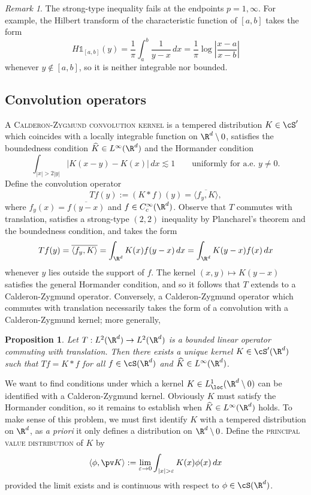 \documentclass[reqno]{amsart}
\newtheorem{proposition}[theorem]{Proposition}
\theoremstyle{definition}
\theoremstyle{remark}
\newtheorem*{remark}{Remark}
\renewcommand{\epsilon}{\varepsilon}
\renewcommand{\emph}{\textsc}
\begin{document}
\begin{remark}
	The strong-type inequality fails at the endpoints $p = 1, \infty$. For example, the Hilbert transform of the characteristic function of $[a, b]$ takes the form
		\[ H \mathbb 1_{[a, b]} (y) = \frac1\pi \int_a^b \frac{1}{y - x} \, dx = \frac1\pi \log \left| \frac{x - a}{x - b} \right| \]
	whenever $y \not\in [a, b]$, so it is neither integrable nor bounded. 
\end{remark}

\subsection{Convolution operators}
\label{sec:convop}
A \emph{Calderon-Zygmund convolution kernel} is a tempered distribution $K \in \cS'$ which coincides with a locally integrable function on $\R^d \setminus 0$, satisfies the boundedness condition $\widehat K \in L^\infty (\R^d)$ and the Hormander condition 
	\[ \int_{|x| > 2|y|} |K(x - y) - K(x)| \, dx \lesssim 1 \qquad \text{uniformly for a.e. } y \neq 0. \]
Define the convolution operator
	\[ Tf (y) := (K * f) (y) = \overline{\langle f_y, K \rangle}, \]
where $f_y (x) = \overline{f(y - x)}$ and $f \in C^\infty_c (\R^d)$. Observe that $T$ commutes with translation, satisfies a strong-type $(2, 2)$ inequality by Plancharel's theorem and the boundedness condition, and takes the form 
	\[ Tf(y) = \overline{\langle f_y, K \rangle} =  \int_{\R^d} K(x) f(y - x) \, dx = \int_{\R^d} K(y - x) f(x) \, dx \]	
whenever $y$ lies outside the support of $f$. The kernel $(x, y) \mapsto K(y - x)$ satisfies the general Hormander condition, and so it follows that $T$ extends to a Calderon-Zygmund operator. Conversely, a Calderon-Zygmund operator which commutes with translation necessarily takes the form of a convolution with a Calderon-Zygmund kernel; more generally, 

\begin{proposition}
	Let $T: L^2 (\R^d) \to L^2 (\R^d)$ is a bounded linear operator commuting with translation. Then there exists a unique kernel $K \in \cS' (\R^d)$ such that $Tf = K * f$ for all $f \in \cS (\R^d)$ and $\widehat K \in L^\infty (\R^d)$. 
\end{proposition}

We want to find conditions under which a kernel $K \in L^1_{\loc} (\R^d \setminus 0)$ can be identified with a Calderon-Zygmund kernel. Obviously $K$ must satisfy the Hormander condition, so it remains to establish when $\widehat K \in L^\infty (\R^d)$ holds. To make sense of this problem, we must first identify $K$ with a tempered distribution on $\R^d$, as \textit{a priori} it only defines a distribution on $\R^d \setminus 0$. Define the \emph{principal value distribution} of $K$ by
	\[ \langle \phi,  \pv K \rangle := \lim_{\epsilon \to 0} \int_{|x| > \epsilon} K(x) \phi(x) \, dx \]
provided the limit exists and is continuous with respect to $\phi \in \cS (\R^d)$.
\end{document}
